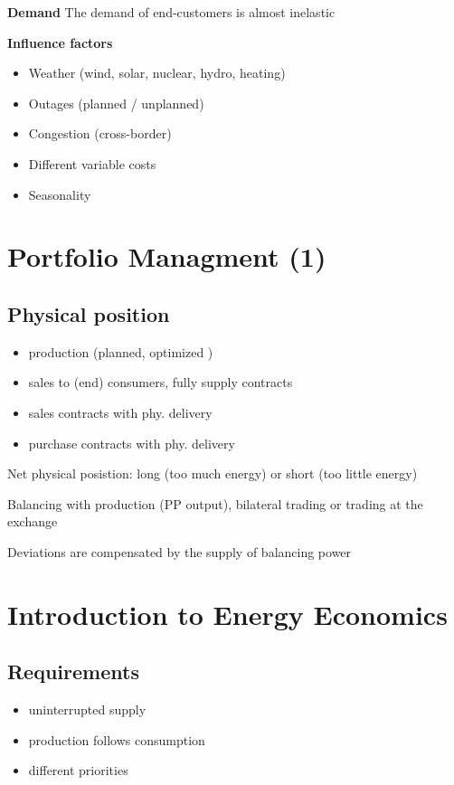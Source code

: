 \documentclass[fs, footer]{latex4ei}
\begin{document}
\begin{multicols*}{4}
 \textbf{Demand}
 The demand of end-customers is almost inelastic 

 \textbf{Influence factors} 
 \begin{itemize}
 	\item Weather (wind, solar, nuclear, hydro, heating)
 	\item Outages (planned / unplanned)
 	\item Congestion (cross-border)
 	\item Different variable costs
 	\item Seasonality
 \end{itemize}

\section{Portfolio Managment (1)} 

\subsection*{Physical position}
\begin{itemize}
 	\item production (planned, optimized )
 	\item sales to (end) consumers, fully supply contracts
 	\item sales contracts with phy. delivery
 	\item purchase contracts with phy. delivery
 \end{itemize}

 Net physical posistion: long (too much energy) or short (too little energy)

 Balancing with production (PP output), bilateral trading or trading at the exchange

 Deviations are compensated by the supply of balancing power
\section{Introduction to Energy Economics}

\subsection*{Requirements}
\begin{itemize}
 	\item uninterrupted supply
 	\item production follows consumption
 	\item different priorities
 \end{itemize} 


\end{multicols*}
\end{document}
